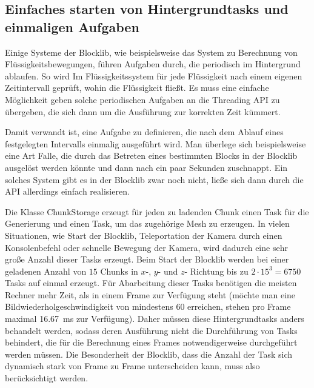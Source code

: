 \subsection{Einfaches starten von Hintergrundtasks und einmaligen Aufgaben}\label{sec:reqBackgroundTasks}
Einige Systeme der Blocklib, wie beispielsweise das System zu Berechnung von Flüssigkeitsbewegungen, führen Aufgaben durch, die periodisch im Hintergrund ablaufen. So wird Im Flüssigkeitssystem für jede Flüssigkeit nach einem eigenen Zeitintervall geprüft, wohin die Flüssigkeit fließt. Es muss eine einfache Möglichkeit geben solche periodischen Aufgaben an die Threading API zu übergeben, die sich dann um die Ausführung zur korrekten Zeit kümmert.

Damit verwandt ist, eine Aufgabe zu definieren, die nach dem Ablauf eines festgelegten Intervalls einmalig ausgeführt wird. Man überlege sich beispielsweise eine Art Falle, die durch das Betreten eines bestimmten Blocks in der Blocklib ausgelöst werden könnte und dann nach ein paar Sekunden zuschnappt. Ein solches System gibt es in der Blocklib zwar noch nicht, ließe sich dann durch die API allerdings einfach realisieren.

Die Klasse ChunkStorage erzeugt für jeden zu ladenden Chunk einen Task für die Generierung und einen Task, um das zugehörige Mesh zu erzeugen. In vielen Situationen, wie  Start der Blocklib, Teleportation der Kamera durch einen Konsolenbefehl oder schnelle Bewegung der Kamera, wird dadurch eine sehr große Anzahl dieser Tasks erzeugt. Beim Start der Blocklib werden bei einer geladenen Anzahl von $15$ Chunks in  $x$-, $y$- und $z$- Richtung bis zu $2\cdot15^3=6750$  Tasks auf einmal erzeugt. Für Abarbeitung dieser Tasks benötigen die meisten Rechner mehr Zeit, als in einem Frame zur Verfügung steht (möchte man eine Bildwiederholgeschwindigkeit von mindestens \SI{60}{\fps} erreichen, stehen pro Frame maximal \SI{16,67}{\milli\second} zur Verfügung). Daher müssen diese Hintergrundtasks anders behandelt werden, sodass deren Ausführung nicht die Durchführung von Tasks behindert, die für die Berechnung eines Frames notwendigerweise durchgeführt werden müssen. Die Besonderheit der Blocklib, dass die Anzahl der Task sich dynamisch stark von Frame zu Frame unterscheiden kann, muss also berücksichtigt werden.